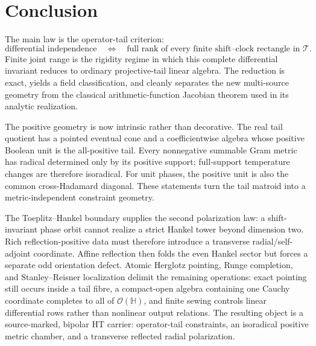 \documentclass[11pt]{article}
\theoremstyle{definition}
\theoremstyle{remark}
\newcommand{\cT}{\mathcal T}
\newcommand{\cO}{\mathcal O}
\begin{document}
\section{Conclusion}

The main law is the operator-tail criterion:
\[
  \text{differential independence}
  \quad\Longleftrightarrow\quad
  \text{full rank of every finite shift--clock rectangle in }\cT.
\]
Finite joint range is the rigidity regime in which this complete differential invariant reduces
to ordinary projective-tail linear algebra.  The reduction is exact, yields a field
classification, and cleanly separates the new multi-source geometry from the classical
arithmetic-function Jacobian theorem used in its analytic realization.

The positive geometry is now intrinsic rather than decorative.  The real tail quotient has a
pointed eventual cone and a coefficientwise algebra whose positive Boolean unit is the
all-positive tail.  Every nonnegative summable Gram metric has radical determined only by its
positive support; full-support temperature changes are therefore isoradical.  For unit phases,
the positive unit is also the common cross-Hadamard diagonal.  These statements turn the tail
matroid into a metric-independent constraint geometry.

The Toeplitz--Hankel boundary supplies the second polarization law: a shift-invariant phase orbit
cannot realize a strict Hankel tower beyond dimension two.  Rich reflection-positive data must
therefore introduce a transverse radial/self-adjoint coordinate.  Affine reflection then folds
the even Hankel sector but forces a separate odd orientation defect.  Atomic Herglotz pointing,
Runge completion, and Stanley--Reisner localization delimit the remaining operations: exact
pointing still occurs inside a tail fibre, a compact-open algebra containing one Cauchy coordinate
completes to all of \(\cO(\mathbb H)\), and finite sewing controls linear differential rows rather
than nonlinear output relations.  The resulting object is a source-marked, bipolar HT carrier:
operator-tail constraints, an isoradical positive metric chamber, and a transverse reflected
radial polarization.
\end{document}
